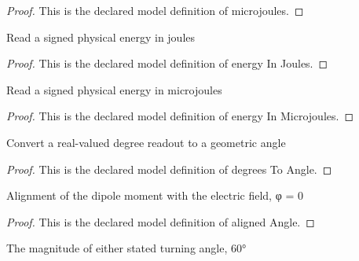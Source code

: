 \begin{proof}
  This is the declared model definition of microjoules.
\end{proof}
\begin{definition}
  \label{def:physics:phyx-mini-0856:phyxminiproblems-problemphyxmini0856-energyinjoules}
  Read a signed physical energy in joules
\end{definition}
\begin{proof}
  This is the declared model definition of energy In Joules.
\end{proof}
\begin{definition}
  \label{def:physics:phyx-mini-0856:phyxminiproblems-problemphyxmini0856-energyinmicrojoules}
  Read a signed physical energy in microjoules
\end{definition}
\begin{proof}
  This is the declared model definition of energy In Microjoules.
\end{proof}
\begin{definition}
  \label{def:physics:phyx-mini-0856:phyxminiproblems-problemphyxmini0856-degreestoangle}
  Convert a real-valued degree readout to a geometric angle
\end{definition}
\begin{proof}
  This is the declared model definition of degrees To Angle.
\end{proof}
\begin{definition}
  \label{def:physics:phyx-mini-0856:phyxminiproblems-problemphyxmini0856-alignedangle}
  Alignment of the dipole moment with the electric field, φ = 0
\end{definition}
\begin{proof}
  This is the declared model definition of aligned Angle.
\end{proof}
\begin{definition}
  \label{def:physics:phyx-mini-0856:phyxminiproblems-problemphyxmini0856-sixtydegrees}
  The magnitude of either stated turning angle, 60°
\end{definition}
